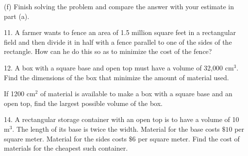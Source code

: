 \documentclass{sebase}
\begin{document}
\begin{multicols}{2}
\begin{ExerciseList}
\begin{ExerciseList}
\item[(f)] Finish solving the problem and compare the answer with your
estimate in part (a).

%
\end{ExerciseList}

\item[\hfill 11.] A farmer wants to fence an area of 1.5 million square feet
in a rectangular field and then divide it in half with a fence parallel to
one of the sides of the rectangle. How can he do this so as to minimize the
cost of the fence?

%

%

\item[\hfill 12.] A box with a square base and open top must have a volume
of 32,000 $\mathrm{cm}^{3}$. Find the dimensions of the box that minimize
the amount of material used.

%

\item[{\hfill {\protect\fbox{\hspace{-2pt}13.\hspace{-2pt}}}}] If 1200 $%
\mathrm{cm}^{2}$ of material is available to make a box with a square base
and an open top, find the largest possible volume of the box.

%

%

\item[\hfill 14.] A rectangular storage container with an open top is to
have a volume of 10 $\mathrm{m}^{3}$. The length of its base is twice the
width. Material for the base costs $\$10$ per square meter. Material for the
sides costs $\$6$ per square meter. Find the cost of materials for the
cheapest such container.


\end{ExerciseList}
\end{multicols}
\end{document}
